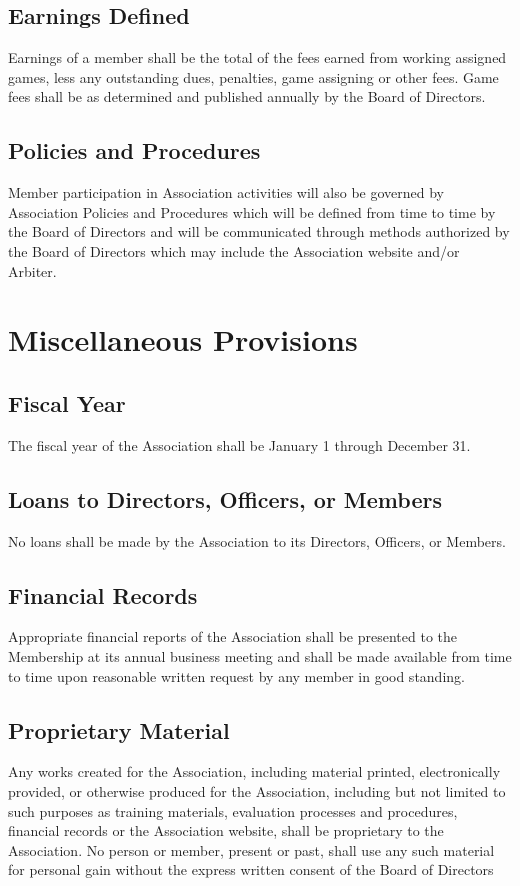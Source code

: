 \documentclass[letterpaper,11pt]{article}
\begin{document}
\subsection{Earnings Defined}
Earnings of a member shall be the total of the fees earned from working assigned games, less any outstanding dues, penalties, game assigning or other fees. Game fees shall be as determined and published annually by the Board of Directors.
\subsection{Policies and Procedures}
Member participation in Association activities will also be governed by Association Policies and Procedures which will be defined from time to time by the Board of Directors and will be communicated through methods authorized by the Board of Directors which may include the Association website and/or Arbiter.
\section{Miscellaneous Provisions}
\subsection{Fiscal Year}
The fiscal year of the Association shall be January 1 through December 31.
\subsection{Loans to Directors, Officers, or Members}
No loans shall be made by the Association to its Directors, Officers, or Members.
\subsection{Financial Records}
Appropriate financial reports of the Association shall be presented to the Membership at its annual business meeting and shall be made available from time to time upon reasonable written request by any member in good standing.
\subsection{Proprietary Material}
Any works created for the Association, including material printed, electronically provided, or otherwise produced for the Association, including but not limited to such purposes as training materials, evaluation processes and procedures, financial records or the Association website, shall be proprietary to the Association. No person or member, present or past, shall use any such material for personal gain without the express written consent of the Board of Directors
\end{document}
